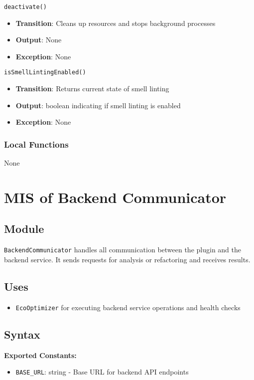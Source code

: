 \documentclass[12pt, titlepage]{article}
\begin{document}
\noindent\texttt{deactivate()}
\begin{itemize}
    \item \textbf{Transition}: Cleans up resources and stops background processes
    \item \textbf{Output}: None
    \item \textbf{Exception}: None
\end{itemize}

\noindent\texttt{isSmellLintingEnabled()}
\begin{itemize}
    \item \textbf{Transition}: Returns current state of smell linting
    \item \textbf{Output}: boolean indicating if smell linting is enabled
    \item \textbf{Exception}: None
\end{itemize}

\subsubsection{Local Functions}
None

\section{MIS of Backend Communicator}

\subsection{Module}
\texttt{BackendCommunicator} handles all communication between the plugin and the backend service. It sends requests for analysis or refactoring and receives results.

\subsection{Uses}
\begin{itemize}
    \item \texttt{EcoOptimizer} for executing backend service operations and health checks
\end{itemize}

\subsection{Syntax}

\textbf{Exported Constants:} 
\begin{itemize}
    \item \texttt{BASE\_URL}: string - Base URL for backend API endpoints
\end{itemize}
\end{document}
